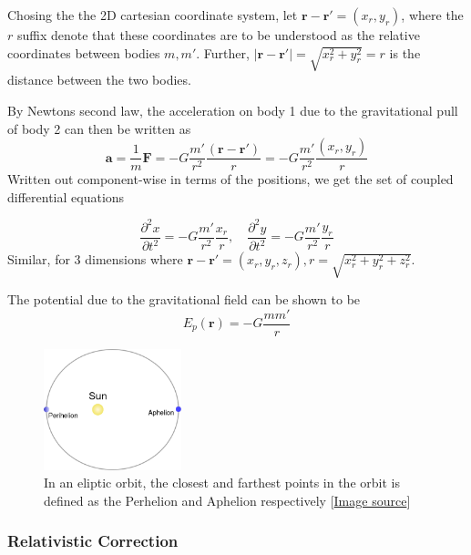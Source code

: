 \documentclass[10pt,showpacs,preprintnumbers,amsmath,amssymb,nofootinbib,aps,prl,twocolumn,groupedaddress,superscriptaddress,showkeys]{revtex4-1}
\begin{document}
    Chosing the the 2D cartesian coordinate system, let $\mathbf r - \mathbf r'= (x_{r}, y_{r})$, where the $r$ suffix denote that these coordinates are to be understood as the relative coordinates between bodies $m, m'$.
    Further, $|\mathbf r - \mathbf r'| = \sqrt{x_r^2 + y_r^2} = r$ is the distance between the two bodies.

    By Newtons second law, the acceleration on body 1 due to the gravitational pull of body 2 can then be written as
    \begin{equation}
      \mathbf a = \frac{1}{m}\mathbf F = -G \frac{m'}{r^2}\frac{(\mathbf r-\mathbf r')}{r} = -G\frac{m'}{r^2}\frac{\left(x_r, y_r\right)}{r}
    \end{equation}
    Written out component-wise in terms of the positions, we get the set of coupled differential equations

    \begin{equation}
      \frac{\partial^2 x}{\partial t^2} = -G\frac{m'}{r^2}\frac{x_r}{r}, \quad
      \frac{\partial^2 y}{\partial t^2} = -G\frac{m'}{r^2}\frac{y_r}{r}
    \end{equation}
    Similar, for 3 dimensions where $\mathbf r - \mathbf r' = (x_r, y_r, z_r), r=\sqrt{x_r^2 + y_r^2 + z_r^2}$.

    The potential due to the gravitational field can be shown to be \cite{elem}
    \begin{equation}
      E_p(\mathbf r) = -G\frac{mm'}{r}
    \end{equation}

      \begin{figure}[h!]
        \center
        \includegraphics[width=4cm]{figs/486px-Perihelion-Aphelion.png}
        \caption{In an eliptic orbit, the closest and farthest points in the orbit is defined as the Perhelion and Aphelion respectively [\href{https://en.wikipedia.org/wiki/Perihelion_and_aphelion}{Image source}]}
        \label{fig:perhelion}
      \end{figure}

    
    \subsubsection{Relativistic Correction}
\end{document}

